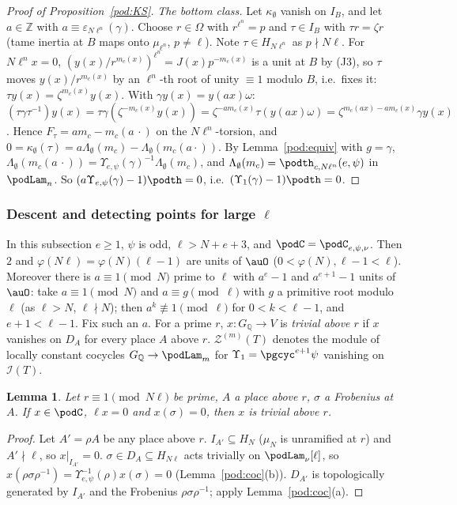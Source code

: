 \documentclass[10pt]{amsart}
\newtheorem{lemma}[theorem]{Lemma}
\theoremstyle{definition}
\theoremstyle{remark}
\newcommand{\Z}{\mathbb Z}
\newcommand{\Q}{\mathbb Q}
\begin{document}
\begin{proof}[Proof of Proposition~\ref{pod:KS}]
\emph{The bottom class.} Let $\kappa_\emptyset$ vanish on $I_B$, and let $a\in\Z$ with $a\equiv
\varepsilon_{N\ell^n}(\gamma)$. Choose $r\in\Omega$ with $r^{\ell^n}=p$ and $\tau\in I_B$ with $\tau r=
\zeta r$ (tame inertia at $B$ maps onto $\mu_{\ell^n}$, $p\ne\ell$). Note $\tau\in H_{N\ell^n}$ as
$p\nmid N\ell$. For $N\ell^nx=0$, $(y(x)/r^{m_c(x)})^{\ell^n}=J(x)p^{-m_c(x)}$ is a unit at $B$ by (J3),
so $\tau$ moves $y(x)/r^{m_c(x)}$ by an $\ell^n$-th root of unity $\equiv1$ modulo $B$, i.e.\ fixes
it: $\tau y(x)=\zeta^{m_c(x)}y(x)$. With $\gamma y(x)=y(ax)\omega$:
$(\tau\gamma\tau^{-1})y(x)=\tau\gamma(\zeta^{-m_c(x)}y(x))=\zeta^{-am_c(x)}\tau(y(ax)\omega)=
\zeta^{m_c(ax)-am_c(x)}\gamma y(x)$. Hence $F_\tau=am_c-m_c(a\,\cdot)$ on the $N\ell^n$-torsion, and
$0=\kappa_\emptyset(\tau)=a\Lambda_\emptyset(m_c)-\Lambda_\emptyset(m_c(a\cdot))$. By
Lemma~\ref{pod:equiv} with $g=\gamma$, $\Lambda_\emptyset(m_c(a\,\cdot))=\Upsilon_{e,\psi}(\gamma)^{-1}
\Lambda_\emptyset(m_c)$, and $\Lambda_\emptyset(m_c)=\podth_{c,N\ell^n}(e,\psi)$ in $\podLam_n$. So
$(a\Upsilon_{e,\psi}(\gamma)-1)\podth=0$, i.e.\ $(\Upsilon_1(\gamma)-1)\podth=0$.
\end{proof}

\subsubsection{Descent and detecting points for large \texorpdfstring{$\ell$}{l}}\label{pod:ss-descent}

In this subsection $e\ge1$, $\psi$ is odd, $\ell>N+e+3$, and $\podC=\podC_{e,\psi,\nu}$. Then $2$ and
$\varphi(N\ell)=\varphi(N)(\ell-1)$ are units of $\auO$ ($0<\varphi(N),\ell-1<\ell$). Moreover there
is $a\equiv1\pmod N$ prime to $\ell$ with $a^e-1$ and $a^{e+1}-1$ units of $\auO$: take $a\equiv1
\pmod N$ and $a\equiv g\pmod\ell$ with $g$ a primitive root modulo $\ell$ (as $\ell>N$, $\ell\nmid N$);
then $a^k\not\equiv1\pmod\ell$ for $0<k<\ell-1$, and $e+1<\ell-1$. Fix such an $a$. For a prime $r$,
$x\colon G_\Q\to V$ is \emph{trivial above $r$} if $x$ vanishes on $D_A$ for every place $A$ above
$r$. $\mathcal Z^{(m)}(T)$ denotes the module of locally constant cocycles $G_\Q\to\podLam_m$ for
$\Upsilon_1=\pgcyc^{e+1}\psi$ vanishing on $\mathcal I(T)$.

\begin{lemma}\label{pod:trivabove}
Let $r\equiv1\pmod{N\ell}$ be prime, $A$ a place above $r$, $\sigma$ a Frobenius at $A$. If $x\in
\podC$, $\ell x=0$ and $x(\sigma)=0$, then $x$ is trivial above $r$.
\end{lemma}
\begin{proof}
Let $A'=\rho A$ be any place above $r$. $I_{A'}\subseteq H_N$ ($\mu_N$ is unramified at $r$) and
$A'\nmid\ell$, so $x|_{I_{A'}}=0$. $\sigma\in D_A\subseteq H_{N\ell}$ acts trivially on
$\podLam_\nu[\ell]$, so $x(\rho\sigma\rho^{-1})=\Upsilon_{e,\psi}^{-1}(\rho)x(\sigma)=0$
(Lemma~\ref{pod:coc}(b)). $D_{A'}$ is topologically generated by $I_{A'}$ and the Frobenius
$\rho\sigma\rho^{-1}$; apply Lemma~\ref{pod:coc}(a).
\end{proof}
\end{document}
